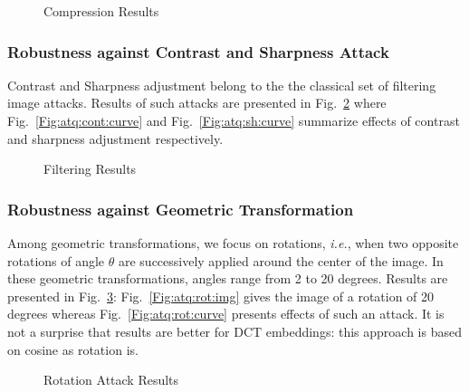 \documentclass{comjnl}
\begin{document}
\begin{figure}[ht]
  \centering
\caption{Compression Results}
\label{Fig:atck:comp}
\end{figure}



\subsubsection{Robustness against Contrast and Sharpness Attack}
Contrast and Sharpness adjustment belong to the the classical set of 
filtering image attacks.
Results of such attacks are presented in 
Fig.~\ref{Fig:atq:fil} where 
Fig.~\ref{Fig:atq:cont:curve} and Fig.~\ref{Fig:atq:sh:curve} summarize 
effects of contrast and sharpness adjustment respectively. 


\begin{figure}[ht]
  \centering
\caption{Filtering Results}
\label{Fig:atq:fil}
\end{figure}

\subsubsection{Robustness against Geometric Transformation}
Among geometric transformations, we focus on  
rotations, \textit{i.e.}, when two opposite rotations 
of angle $\theta$ are successively applied around the center of the image.
In these geometric transformations,  angles range from 2 to 20 
degrees.  
Results are presented in Fig.~\ref{Fig:atq:rot}: Fig.~\ref{Fig:atq:rot:img}
gives the image of a rotation of 20 degrees whereas
Fig.~\ref{Fig:atq:rot:curve} presents effects of such an attack.
It is not a surprise that results are better for DCT embeddings: this approach
is based on cosine as rotation is. 



\begin{figure}[ht]
  \centering


\caption{Rotation Attack Results}
\label{Fig:atq:rot}
\end{figure}
\end{document}
